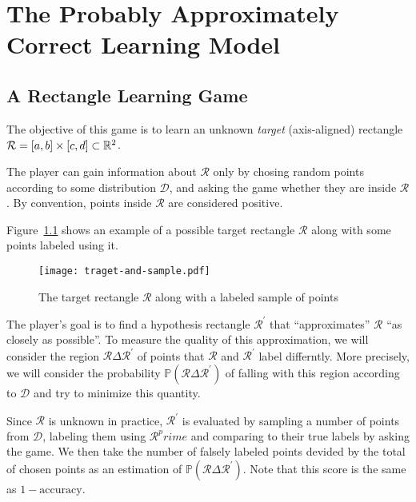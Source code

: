 \chapter{The Probably Approximately Correct Learning Model}
    \section{A Rectangle Learning Game}
    \newcommand{\rectangle}{\mathcal{R}}
    The objective of this game is to learn an unknown \emph{target} (axis-aligned) rectangle \(\rectangle = [a, b] \times [c, d] \subset \reals^2\).

    The player can gain information about \(\rectangle\) only by chosing random points according to some distribution \(\mathcal{D}\), and asking the game whether they are inside \(\rectangle\). By convention, points inside \(\rectangle\) are considered positive.

    Figure~\ref{fig:traget-and-sample} shows an example of a possible target rectangle \(\rectangle\) along with some points labeled using it.

    \begin{figure}
        \begin{center}
            \texttt{[image: traget-and-sample.pdf]}
        \end{center}
        \caption{The target rectangle \(\rectangle\) along with a labeled sample of points}
        \label{fig:traget-and-sample}
    \end{figure}
    
    The player's goal is to find a hypothesis rectangle \(\rectangle^\prime\) that ``approximates'' \(\rectangle\) ``as closely as possible''. To measure the quality of this approximation, we will consider the region \(\rectangle\Delta\rectangle^\prime\) of points that \(\rectangle\) and \(\rectangle^\prime\) label differntly. More precisely, we will consider the probability \(\mathbb{P}(\rectangle\Delta\rectangle^\prime)\) of falling with this region according to \(\mathcal{D}\) and try to minimize this quantity.

    Since \(\rectangle\) is unknown in practice, \(\rectangle^\prime\) is evaluated by sampling a number of points from \(\mathcal{D}\), labeling them using \(\rectangle^prime\) and comparing to their true labels by asking the game. We then take the number of falsely labeled points devided by the total of chosen points as an estimation of \(\mathbb{P}(\rectangle\Delta\rectangle^\prime)\).
    Note that this score is the same as \(1 - \mathrm{accuracy}\).

